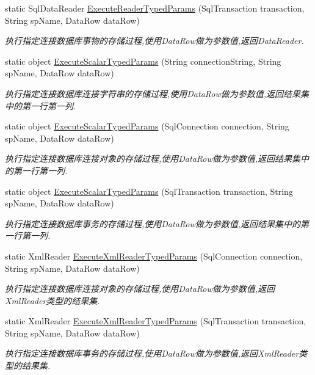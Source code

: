 \begin{DoxyCompactItemize}
static Sql\-Data\-Reader \hyperlink{class_x_c_l_net_tools_1_1_data_base_1_1_m_s_s_q_l_1_1_sql_helper_a40ee3a122708ca4b02a0fdcf04ec0cff}{Execute\-Reader\-Typed\-Params} (Sql\-Transaction transaction, String sp\-Name, Data\-Row data\-Row)
\begin{DoxyCompactList}\small\item\em 执行指定连接数据库事物的存储过程,使用\-Data\-Row做为参数值,返回\-Data\-Reader. \end{DoxyCompactList}\item 
static object \hyperlink{class_x_c_l_net_tools_1_1_data_base_1_1_m_s_s_q_l_1_1_sql_helper_a3fd8c1d336c69ad37c1534c6c7ea9ac5}{Execute\-Scalar\-Typed\-Params} (String connection\-String, String sp\-Name, Data\-Row data\-Row)
\begin{DoxyCompactList}\small\item\em 执行指定连接数据库连接字符串的存储过程,使用\-Data\-Row做为参数值,返回结果集中的第一行第一列. \end{DoxyCompactList}\item 
static object \hyperlink{class_x_c_l_net_tools_1_1_data_base_1_1_m_s_s_q_l_1_1_sql_helper_af228313b12488cf92cbb31e7c331d9a3}{Execute\-Scalar\-Typed\-Params} (Sql\-Connection connection, String sp\-Name, Data\-Row data\-Row)
\begin{DoxyCompactList}\small\item\em 执行指定连接数据库连接对象的存储过程,使用\-Data\-Row做为参数值,返回结果集中的第一行第一列. \end{DoxyCompactList}\item 
static object \hyperlink{class_x_c_l_net_tools_1_1_data_base_1_1_m_s_s_q_l_1_1_sql_helper_a07fae5fa10db00a6b1f46b9a7d934117}{Execute\-Scalar\-Typed\-Params} (Sql\-Transaction transaction, String sp\-Name, Data\-Row data\-Row)
\begin{DoxyCompactList}\small\item\em 执行指定连接数据库事务的存储过程,使用\-Data\-Row做为参数值,返回结果集中的第一行第一列. \end{DoxyCompactList}\item 
static Xml\-Reader \hyperlink{class_x_c_l_net_tools_1_1_data_base_1_1_m_s_s_q_l_1_1_sql_helper_a43fe7cde3a7b3b999d66aa53f654d363}{Execute\-Xml\-Reader\-Typed\-Params} (Sql\-Connection connection, String sp\-Name, Data\-Row data\-Row)
\begin{DoxyCompactList}\small\item\em 执行指定连接数据库连接对象的存储过程,使用\-Data\-Row做为参数值,返回\-Xml\-Reader类型的结果集. \end{DoxyCompactList}\item 
static Xml\-Reader \hyperlink{class_x_c_l_net_tools_1_1_data_base_1_1_m_s_s_q_l_1_1_sql_helper_a51c3cdda89ada8ca4fda0f3d513b8214}{Execute\-Xml\-Reader\-Typed\-Params} (Sql\-Transaction transaction, String sp\-Name, Data\-Row data\-Row)
\begin{DoxyCompactList}\small\item\em 执行指定连接数据库事务的存储过程,使用\-Data\-Row做为参数值,返回\-Xml\-Reader类型的结果集. \end{DoxyCompactList}\end{DoxyCompactItemize}


